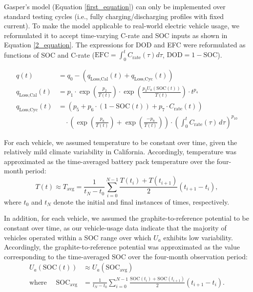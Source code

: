 \documentclass[pdflatex,sn-nature]{sn-jnl}%
\theoremstyle{thmstyleone}%
\theoremstyle{thmstyletwo}%
\theoremstyle{thmstylethree}%
\begin{document}
Gasper's model (Equation \ref{first_equation}) can only be implemented over standard testing cycles (i.e., fully charging/discharging profiles with fixed current). To make the model applicable to real-world electric vehicle usage, we reformulated it to accept time-varying C-rate and SOC inputs as shown in Equation \ref{2_equation}. The expressions for DOD and EFC were reformulated as functions of SOC and C-rate ($\text{EFC}= \int_0^t C_\text{rate} (\tau)d\tau$, $\text{DOD}= 1-\text{SOC}$).

\begin{equation}
\label{2_equation}
\begin{aligned}
q(t) &= q_0 - \left( q_{\text{Loss,Cal}}(t) + q_{\text{Loss,Cyc}}(t) \right) \\
q_{\text{Loss,Cal}}(t) &= p_1 \cdot \exp\left(\frac{p_2}{T(t)}\right) \cdot \exp\left(\frac{p_3 U_a(\text{SOC}(t))}{T(t)}\right) \cdot t^{p_4}\\
q_{\text{Loss,Cyc}}(t) &= \left(p_5 + p_6 \cdot \left(1-\text{SOC}(t)\right) + p_7 \cdot C_{\text{rate}}(t)\right) \\
&\quad \cdot \left(\exp\left(\frac{p_8}{T(t)}\right) + \exp\left(\frac{-p_9}{T(t)}\right)\right) \cdot \left(\int_{0}^{t} C_{\text{rate}}(\tau) \, d\tau\right)^{p_{10}}
\end{aligned}
\end{equation}



For each vehicle, we assumed temperature to be constant over time, given the relatively mild climate variability in California. Accordingly, temperature was approximated as the time-averaged battery pack temperature over the four-month period:
\begin{equation}
\label{eq:time_averaged_temperature}
T(t) \approx T_{\mathrm{avg}} = \frac{1}{t_N - t_0} \sum_{i=0}^{N-1} \frac{ T(t_i) + T(t_{i+1}) }{2} \left( t_{i+1} - t_i \right),
\end{equation}
where $t_0$ and $t_N$ denote the initial and final instances of times, respectively.


In addition, for each vehicle, we assumed the graphite-to-reference potential to be constant over time, as our vehicle-usage data indicate that the majority of vehicles operated within a SOC range over which $U_a$ exhibits low variability. Accordingly, the graphite-to-reference potential was approximated as the value corresponding to the time-averaged SOC over the four-month observation period:
\begin{equation}
\label{eq:time_averaged_graphite_potential}
\begin{aligned}
U_a(\text{SOC}(t)) &\approx U_a(\text{SOC}_{\mathrm{avg}}) \\
\text{where } \quad \text{SOC}_{\mathrm{avg}} &= \frac{1}{t_N - t_0} \sum_{i=0}^{N-1} \frac{ \text{SOC}(t_i) + \text{SOC}(t_{i+1}) }{2} \left( t_{i+1} - t_i \right).
\end{aligned}
\end{equation}
\end{document}
